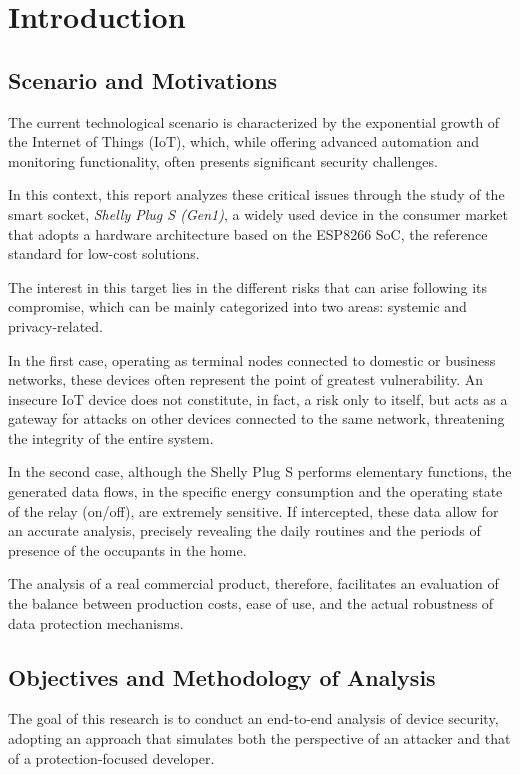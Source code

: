 \chapter*{Introduction}

\section*{Scenario and Motivations} 
The current technological scenario is characterized by the exponential growth of the Internet of Things (IoT), which, while offering advanced automation and monitoring functionality, often presents significant security challenges.

\medskip
\noindent In this context, this report analyzes these critical issues through the study of the smart socket, \emph{Shelly Plug S (Gen1)}, a widely used device in the consumer market that adopts a hardware architecture based on the ESP8266 SoC, the reference standard for low-cost solutions.

\medskip
\noindent The interest in this target lies in the different risks that can arise following its compromise, which can be mainly categorized into two areas: systemic and privacy-related.

\noindent In the first case, operating as terminal nodes connected to domestic or business networks, these devices often represent the point of greatest vulnerability. An insecure IoT device does not constitute, in fact, a risk only to itself, but acts as a gateway for attacks on other devices connected to the same network, threatening the integrity of the entire system.

\noindent In the second case, although the Shelly Plug S performs elementary functions, the generated data flows, in the specific energy consumption and the operating state of the relay (on/off), are extremely sensitive. If intercepted, these data allow for an accurate analysis, precisely revealing the daily routines and the periods of presence of the occupants in the home.

\medskip
\noindent The analysis of a real commercial product, therefore, facilitates an evaluation of the balance between production costs, ease of use, and the actual robustness of data protection mechanisms.

\section*{Objectives and Methodology of Analysis} 
The goal of this research is to conduct an end-to-end analysis of device security, adopting an approach that simulates both the perspective of an attacker and that of a protection-focused developer.

